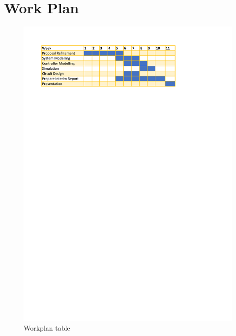 \section{Work Plan}
\begin{figure}[!h]
\includegraphics{Figures/workplan}
\caption{Workplan table}
\end{figure}

